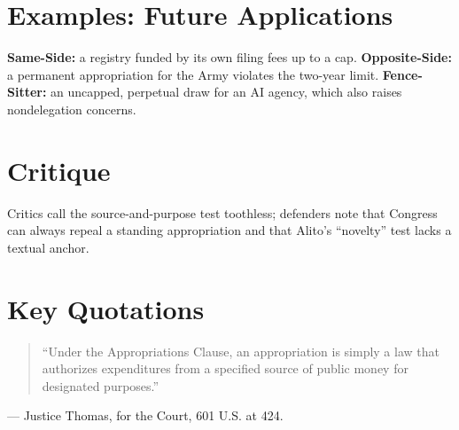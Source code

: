 \documentclass[12pt]{article}
\begin{document}
\section{Examples: Future Applications}
\textbf{Same-Side:} a registry funded by its own filing fees up to a cap. \textbf{Opposite-Side:} a permanent appropriation for the Army violates the two-year limit. \textbf{Fence-Sitter:} an uncapped, perpetual draw for an AI agency, which also raises nondelegation concerns.

\section{Critique}
Critics call the source-and-purpose test toothless; defenders note that Congress can always repeal a standing appropriation and that Alito's ``novelty'' test lacks a textual anchor.

\section{Key Quotations}
\begin{quote}
``Under the Appropriations Clause, an appropriation is simply a law that authorizes expenditures from a specified source of public money for designated purposes.''
\end{quote}
\noindent --- Justice Thomas, for the Court, 601 U.S. at 424.
\end{document}
